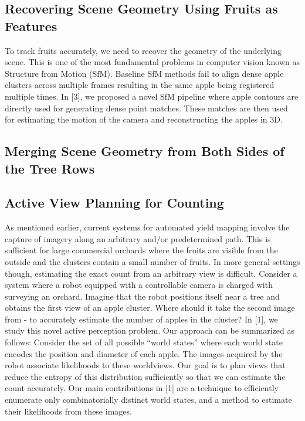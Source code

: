 \subsection{Recovering Scene Geometry Using Fruits as Features}
To track fruits accurately, we need to recover the geometry of the underlying scene. This is one of the most fundamental problems in computer vision known as Structure from Motion (SfM). Baseline SfM methods fail to align dense apple clusters across multiple frames resulting in the same apple being registered multiple times. In [3], we proposed a novel SfM pipeline where apple contours are directly used for generating dense point matches. These matches are then used for estimating the motion of the camera and reconstructing the apples in 3D. 

\subsection{Merging Scene Geometry from Both Sides of the Tree Rows}


\subsection{Active View Planning for Counting} 
As mentioned earlier, current systems for automated yield mapping involve the capture of imagery along an arbitrary and/or predetermined path. This is sufficient for large commercial orchards where the fruits are visible from the outside and the clusters contain a small number of fruits. In more general settings though, estimating the exact count from an arbitrary view is difficult. Consider a system where a robot equipped with a controllable camera is charged with surveying an orchard. Imagine that the robot positions itself near a tree and obtains the first view of an apple cluster. Where should it take the second image from - to accurately estimate the number of apples in the cluster? In [1], we study this novel active perception problem. Our approach can be summarized as follows: Consider the set of all possible “world states” where each world state encodes the position and diameter of each apple. The images acquired by the robot associate likelihoods to these worldviews. Our goal is to plan views that reduce the entropy of this distribution sufficiently so that we can estimate the count accurately. Our main contributions in [1] are a technique to efficiently enumerate only combinatorially distinct world states, and a method to estimate their likelihoods from these images. 